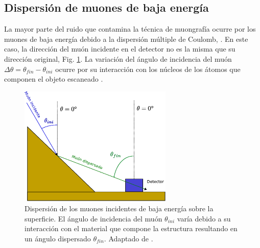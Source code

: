 \subsection{Dispersión de muones de baja energía}

La mayor parte del ruido que contamina la técnica de muongrafía ocurre por los muones de baja energía debido a la dispersión múltiple de Coulomb, \cite{Nishiyama2014,Gomez2017}. En este caso, la dirección del muón incidente en el detector no es la misma que su dirección original, Fig. \ref{Scattering}. La variación del ángulo de incidencia del muón $\Delta \theta = \theta_{fin}-\theta_{ini}$ ocurre por su interacción con los núcleos de los átomos que componen el objeto escaneado \cite{Furlan2013, Pesente2009}.

\begin{figure}[h!]
\begin{center}
\includegraphics[width=0.65\textwidth]{Figures/Muon_scattering.eps}
\caption[Dispersión de los muones incidentes de baja energía sobre la superficie]{Dispersión de los muones incidentes de baja energía sobre la superficie. El ángulo de incidencia del muón $\theta_{ini}$ varía debido a su interacción con el material que compone la estructura resultando en un ángulo dispersado $\theta_{fin}$. Adaptado de \cite{Gomez2017}.}
\label{Scattering}
\end{center}
\end{figure}


